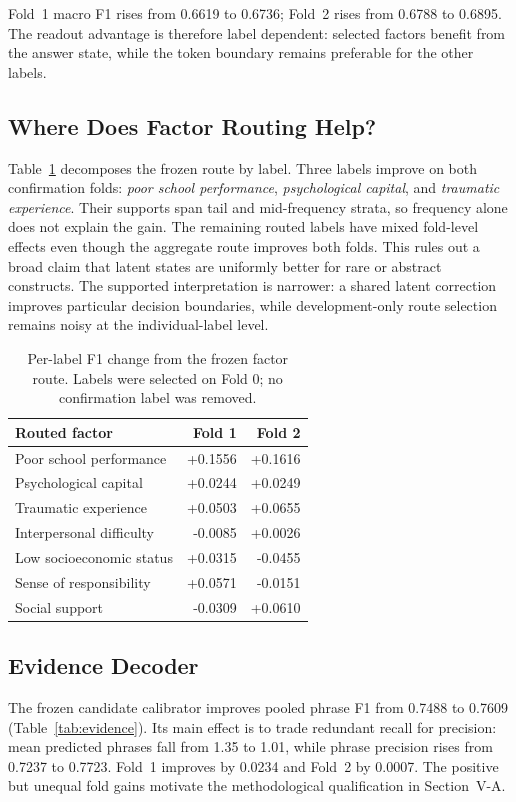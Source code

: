 \documentclass[conference]{IEEEtran}
\begin{document}
Fold~1 macro F1 rises from 0.6619 to 0.6736; Fold~2 rises from 0.6788 to 0.6895. The readout advantage is therefore label dependent: selected factors benefit from the answer state, while the token boundary remains preferable for the other labels.

\subsection{Where Does Factor Routing Help?}
Table~\ref{tab:routediagnostic} decomposes the frozen route by label. Three labels improve on both confirmation folds: \emph{poor school performance}, \emph{psychological capital}, and \emph{traumatic experience}. Their supports span tail and mid-frequency strata, so frequency alone does not explain the gain. The remaining routed labels have mixed fold-level effects even though the aggregate route improves both folds. This rules out a broad claim that latent states are uniformly better for rare or abstract constructs. The supported interpretation is narrower: a shared latent correction improves particular decision boundaries, while development-only route selection remains noisy at the individual-label level.

\begin{table}[t]
\caption{Per-label F1 change from the frozen factor route. Labels were selected on Fold 0; no confirmation label was removed.}
\label{tab:routediagnostic}
\centering
\small
\begin{tabular}{@{}lrr@{}}
\toprule
Routed factor & Fold 1 & Fold 2 \\
\midrule
Poor school performance & +0.1556 & +0.1616 \\
Psychological capital & +0.0244 & +0.0249 \\
Traumatic experience & +0.0503 & +0.0655 \\
Interpersonal difficulty & -0.0085 & +0.0026 \\
Low socioeconomic status & +0.0315 & -0.0455 \\
Sense of responsibility & +0.0571 & -0.0151 \\
Social support & -0.0309 & +0.0610 \\
\bottomrule
\end{tabular}
\end{table}

\subsection{Evidence Decoder}
The frozen candidate calibrator improves pooled phrase F1 from 0.7488 to 0.7609 (Table~\ref{tab:evidence}). Its main effect is to trade redundant recall for precision: mean predicted phrases fall from 1.35 to 1.01, while phrase precision rises from 0.7237 to 0.7723. Fold~1 improves by 0.0234 and Fold~2 by 0.0007. The positive but unequal fold gains motivate the methodological qualification in Section~V-A.
\end{document}
